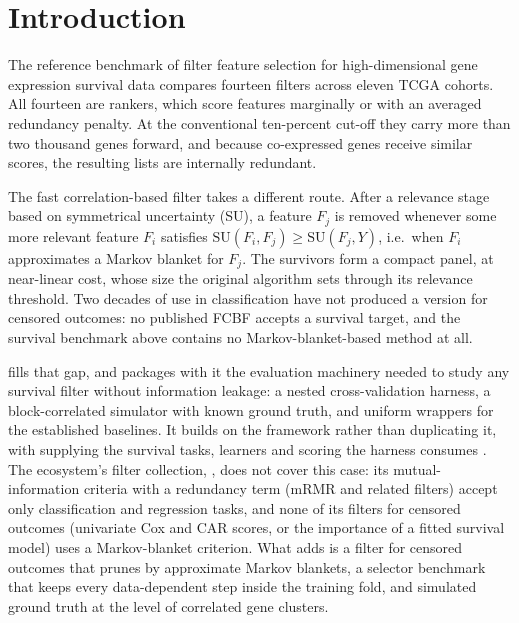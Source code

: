 \section{Introduction}

The reference benchmark of filter feature selection for high-dimensional gene
expression survival data \citep{bommert2021bib} compares fourteen filters across
eleven TCGA cohorts. All fourteen are rankers, which score features marginally
or with an averaged redundancy penalty. At the conventional ten-percent cut-off
they carry more than two thousand genes forward, and because co-expressed genes
receive similar scores, the resulting lists are internally redundant.

The fast correlation-based filter \citep[FCBF;][]{yu2003, yu2004} takes a
different route. After a relevance stage based on symmetrical uncertainty (SU),
a feature $F_j$ is removed whenever some more relevant feature $F_i$ satisfies
$\mathrm{SU}(F_i, F_j) \ge \mathrm{SU}(F_j, Y)$, i.e.\ when $F_i$ approximates a
Markov blanket for $F_j$. The survivors form a compact panel, at near-linear cost,
whose size the original algorithm sets through its relevance threshold. Two decades of use in
classification have not produced a version for censored outcomes: no published
FCBF accepts a survival target, and the survival benchmark above contains no
Markov-blanket-based method at all.

 fills that gap, and packages with it the evaluation machinery
needed to study any survival filter without information leakage: a nested
cross-validation harness, a block-correlated simulator with known ground truth,
and uniform wrappers for the established baselines. It builds on the 
framework \citep{lang2019} rather than duplicating it, with 
supplying the survival tasks, learners and scoring the harness consumes
\citep{sonabend2021}. The ecosystem's filter collection, , does
not cover this case: its mutual-information criteria with a redundancy term (mRMR
and related filters) accept only classification and regression tasks, and none
of its filters for censored outcomes (univariate Cox and CAR scores, or the
importance of a fitted survival model) uses a Markov-blanket criterion. What
 adds is a filter for censored outcomes that prunes by approximate
Markov blankets, a
selector benchmark that keeps every data-dependent step inside the training
fold, and simulated ground truth at the level of correlated gene clusters.

